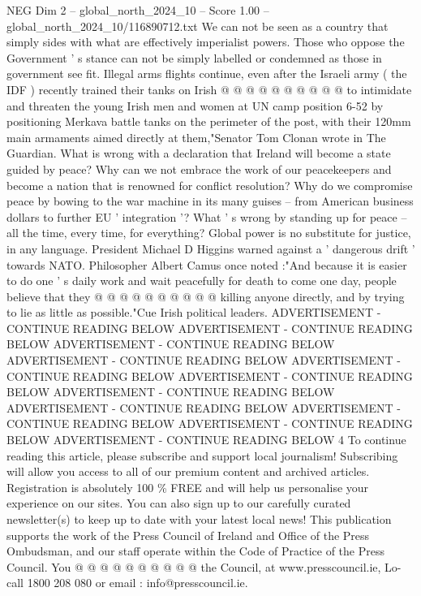 \begin{textsample}{NEG Dim 2 – global\_north\_2024\_10 – Score 1.00 – global\_north\_2024\_10/116890712.txt}
We can not be seen as a country that simply sides with what are effectively imperialist powers.
Those who oppose the Government ' s stance can not be simply labelled or condemned as those in government see fit.
Illegal arms flights continue, even after the Israeli army ( the IDF ) recently trained their tanks on Irish @ @ @ @ @ @ @ @ @ @ to intimidate and threaten the young Irish men and women at UN camp position 6-52 by positioning Merkava battle tanks on the perimeter of the post, with their 120mm main armaments aimed directly at them,"Senator Tom Clonan wrote in The Guardian.
What is wrong with a declaration that Ireland will become a state guided by peace?
Why can we not embrace the work of our peacekeepers and become a nation that is renowned for conflict resolution?
Why do we compromise peace by bowing to the war machine in its many guises -- from American business dollars to further EU ' integration '?
What ' s wrong by standing up for peace -- all the time, every time, for everything?
Global power is no substitute for justice, in any language.
President Michael D Higgins warned against a ' dangerous drift ' towards NATO.
Philosopher Albert Camus once noted :"And because it is easier to do one ' s daily work and wait peacefully for death to come one day, people believe that they @ @ @ @ @ @ @ @ @ @ killing anyone directly, and by trying to lie as little as possible."Cue Irish political leaders.
ADVERTISEMENT - CONTINUE READING BELOW ADVERTISEMENT - CONTINUE READING BELOW ADVERTISEMENT - CONTINUE READING BELOW ADVERTISEMENT - CONTINUE READING BELOW ADVERTISEMENT - CONTINUE READING BELOW ADVERTISEMENT - CONTINUE READING BELOW ADVERTISEMENT - CONTINUE READING BELOW ADVERTISEMENT - CONTINUE READING BELOW ADVERTISEMENT - CONTINUE READING BELOW ADVERTISEMENT - CONTINUE READING BELOW ADVERTISEMENT - CONTINUE READING BELOW 4 To continue reading this article, please subscribe and support local journalism!
Subscribing will allow you access to all of our premium content and archived articles.
Registration is absolutely 100 \% FREE and will help us personalise your experience on our sites.
You can also sign up to our carefully curated newsletter(s) to keep up to date with your latest local news!
This publication supports the work of the Press Council of Ireland and Office of the Press Ombudsman, and our staff operate within the Code of Practice of the Press Council.
You @ @ @ @ @ @ @ @ @ @ the Council, at www.presscouncil.ie, Lo-call 1800 208 080 or email : info@presscouncil.ie.

\end{textsample}
